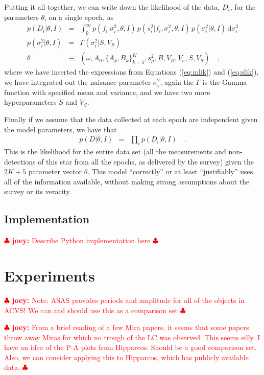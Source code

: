 \documentclass[12pt,preprint]{aastex}
\newcommand{\dd}{\mathrm{d}}
\newcommand{\fobs}{f_i}
\newcommand{\sobs}{s^2_i}
\newcommand{\joey}[1] { \textcolor{red} {
\ensuremath{\clubsuit} {\bf joey:}  {#1}
\ensuremath{\clubsuit} } }%
\begin{document}
Putting it all together, we can write down the likelihood of the data, $D_i$, for the parameters $\theta$, on a single epoch, as
\begin{eqnarray}\displaystyle
p(D_i|\theta,I) &=& \int_0^{\infty} p(\fobs |\sigma^2_i,\theta,I)\, p(\sobs | \fobs, \sigma^2_i,\theta,I)\, p(\sigma^2_i | \theta, I)\,\dd \sigma^2_i
\\
p(\sigma^2_i|\theta, I) &=& \Gamma(\sigma^2_i | S, V_S)
\\
\theta &\equiv& (\omega, A_0, \{A_k, B_k\}_{k=1}^K, s^2_\mu, B, V_B, V_{\sigma}, S, V_S) \quad ,
\end{eqnarray}
where we have inserted the expressions from Equations (\ref{eq:mlik}) and (\ref{eq:slik}), we have integrated out the nuisance parameter $\sigma^2_i$, again the $\Gamma$ is the Gamma function with specified mean and variance, and we have two more hyperparameters $S$ and $V_S$.

Finally if we assume that the data collected at each epoch are independent given the model parameters, we have that
\begin{eqnarray}\displaystyle
p(D|\theta,I) &=& \prod_i p(D_i|\theta,I)
\quad.
\end{eqnarray}
This is the likelihood for the entire
data set (all the measurements and non-detections of this star from
all the epochs, as delivered by the survey) given the $2K + 5$ parameter vector $\theta$.  This model
``correctly'' or at least ``justifiably'' uses all of the information
available, without making strong assumptions about the survey or its
veracity.





\subsection{Implementation}
\label{ss:implemenation}



\joey{Describe Python implementation here}




\section{Experiments}
\label{sec:experiments}

\joey{Note: ASAS provides periods and amplitude for all of the objects in ACVS!  We can and should use this as a comparison set}

\joey{From a brief reading of a few Mira papers, it seems that some papers throw away Miras for which no trough of the LC was observed.  This seems silly.  I have an idea of the P-A plots from Hipparcos.  Should be a good comparison set.  Also, we can consider applying this to Hipparcos, which has publicly available data.}
\end{document}
